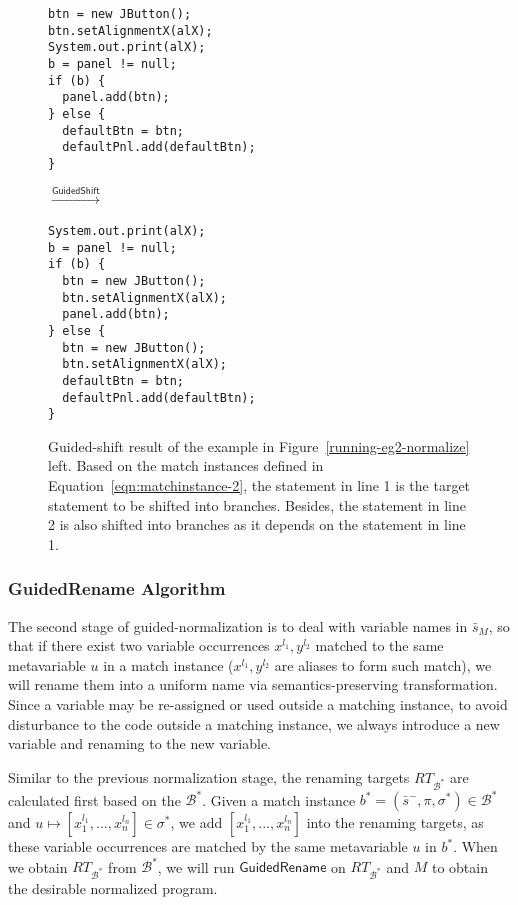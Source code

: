 \documentclass[letterpaper, USenglish]{lipics-v2016}
\newenvironment{smpage}[1]
{\begin{lrbox}{\fmbox}\begin{minipage}{#1}}
{\end{minipage}\end{lrbox}\usebox{\fmbox}}
\theoremstyle{plain}
\begin{document}
\begin{figure}[ht]
\begin{center}
\begin{smpage}{0.34\columnwidth}
\begin{lstlisting}[style=patl,frame=none,basicstyle=\ttfamily\scriptsize]
btn = new JButton();
btn.setAlignmentX(alX);
System.out.print(alX);
b = panel != null;
if (b) {
  panel.add(btn);
} else {
  defaultBtn = btn;
  defaultPnl.add(defaultBtn);
}
\end{lstlisting}
\end{smpage}
\!\!\!\!\!\!$\xrightarrow{\mathsf{GuidedShift}}$~~~~~
\begin{smpage}{0.4\columnwidth}
\begin{lstlisting}[style=patl,frame=none,basicstyle=\ttfamily\scriptsize]
System.out.print(alX);
b = panel != null;
if (b) {
  btn = new JButton();
  btn.setAlignmentX(alX);
  panel.add(btn);
} else {
  btn = new JButton();
  btn.setAlignmentX(alX);
  defaultBtn = btn;
  defaultPnl.add(defaultBtn);
}
\end{lstlisting}
\end{smpage}
\end{center}
\caption{Guided-shift result of the example in Figure~\ref{running-eg2-normalize} left. Based on the match instances defined in Equation~\ref{eqn:matchinstance-2}, the statement in line 1 is the target statement to be shifted into branches. Besides, the statement in line 2 is also shifted into branches as it depends on the statement in line 1.}
\label{running-eg2-shift}
\end{figure}

\subsubsection{GuidedRename Algorithm}

The second stage of guided-normalization is to deal with variable
names in $\bar{s}_M$, so that if there exist two variable occurrences
$x^{l_1}, y^{l_2}$ matched to the same metavariable $u$ in a match
instance ($x^{l_1},y^{l_2}$ are aliases to form such match), we will
rename them into a uniform name via semantics-preserving
transformation. Since a variable may be re-assigned or
used outside a matching instance, to avoid disturbance to the code outside a matching instance, we always introduce a new variable and renaming to the new variable.

Similar to the previous normalization stage, the renaming targets
$\mathit{RT}_{\mathcal{B}^{*}}$ are calculated first based on the
$\mathcal{B}^{*}$. Given a match instance
$b^*=(\bar{s}^-,\pi,\sigma^*)\in \mathcal{B}^*$ and  $u\mapsto[x^{l_1}_{1},...,x^{l_n}_{n}]\in\sigma^{*}$, we add $[x^{l_1}_1,...,x^{l_n}_n]$ into the renaming targets, as these variable occurrences are matched by the same metavariable $u$ in $b^*$. When we obtain $\mathit{RT}_{\mathcal{B}^*}$ from $\mathcal{B}^*$, we will run $\mathsf{GuidedRename}$ on $\mathit{RT}_{\mathcal{B}^*}$ and $M$ to obtain the desirable normalized program.
\end{document}

